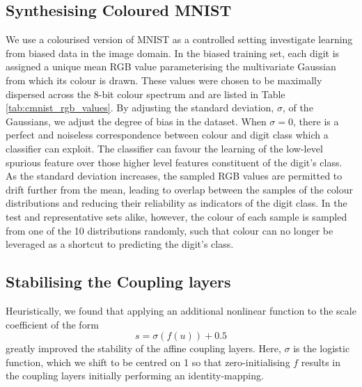 \subsection{Synthesising Coloured MNIST}\label{sec:color-details}
\noindent We use a colourised version of MNIST as a controlled setting investigate learning from biased data in the image domain. In the biased training set, each digit is assigned a unique mean RGB value parameterising the multivariate Gaussian from which its colour is drawn. These values were chosen to be maximally dispersed across the 8-bit colour spectrum and are listed in Table \ref{tab:cmnist_rgb_values}. By adjusting the standard deviation, $\sigma$, of the Gaussians, we adjust the degree of bias in the dataset. When $\sigma=0$, there is a perfect and noiseless correspondence between colour and digit class which a classifier can exploit. The classifier can favour the learning of the low-level spurious feature over those higher level features constituent of the digit's class. As the standard deviation increases, the sampled RGB values are permitted to drift further from the mean, leading to overlap between the samples of the colour distributions and reducing their reliability as indicators of the digit class. In the test and representative sets alike, however, the colour of each sample is sampled from one of the 10 distributions randomly, such that colour can no longer be leveraged as a shortcut to predicting the digit's class.

\subsection{Stabilising the Coupling layers}\label{sec:those-darn-coupling-layers}
\noindent Heuristically, we found that  applying an additional nonlinear function to the scale coefficient of the form
$$
s = \sigma (f(u)) + 0.5
$$
greatly improved the stability of the affine coupling layers. Here, $\sigma$ is the logistic function, which we shift to be centred on 1 so that zero-initialising $f$ results in the coupling layers initially performing an identity-mapping.

